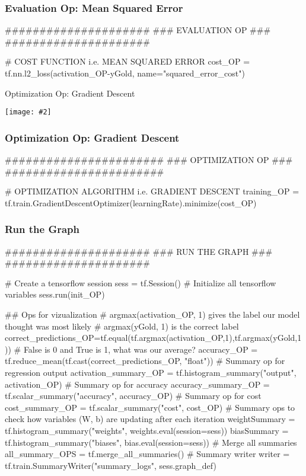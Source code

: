 \documentclass[14pt]{beamer}
\newcommand {\framedgraphic}[2] { %
    \begin{frame}{#1}
        \begin{center}
            \texttt{[image: \#2]}
        \end{center}
    \end{frame}
}
\begin{document}
\begin{frame}[fragile]
  \frametitle{Evaluation Op: Mean Squared Error}
  \begin{python}
#####################
### EVALUATION OP ###
#####################

# COST FUNCTION i.e. MEAN SQUARED ERROR
cost_OP = tf.nn.l2_loss(activation_OP-yGold, name="squared_error_cost")  \end{python}
\end{frame}

\framedgraphic{Optimization Op: Gradient Descent}{6-optimization.png}

\begin{frame}[fragile]
  \frametitle{Optimization Op: Gradient Descent}
  \begin{python}
#######################
### OPTIMIZATION OP ###
#######################

# OPTIMIZATION ALGORITHM i.e. GRADIENT DESCENT
training_OP = tf.train.GradientDescentOptimizer(learningRate).minimize(cost_OP)
  \end{python}
\end{frame}



\begin{frame}[fragile]
  \frametitle{Run the Graph}
  \begin{python}
#####################
### RUN THE GRAPH ###
#####################

# Create a tensorflow session
sess = tf.Session()
# Initialize all tensorflow variables
sess.run(init_OP)

## Ops for vizualization
# argmax(activation_OP, 1) gives the label our model thought was most likely
# argmax(yGold, 1) is the correct label
correct_predictions_OP=tf.equal(tf.argmax(activation_OP,1),tf.argmax(yGold,1))
# False is 0 and True is 1, what was our average?
accuracy_OP = tf.reduce_mean(tf.cast(correct_predictions_OP, "float"))
# Summary op for regression output
activation_summary_OP = tf.histogram_summary("output", activation_OP)
# Summary op for accuracy
accuracy_summary_OP = tf.scalar_summary("accuracy", accuracy_OP)
# Summary op for cost
cost_summary_OP = tf.scalar_summary("cost", cost_OP)
# Summary ops to check how variables (W, b) are updating after each iteration
weightSummary = tf.histogram_summary("weights", weights.eval(session=sess))
biasSummary = tf.histogram_summary("biases", bias.eval(session=sess))
# Merge all summaries
all_summary_OPS = tf.merge_all_summaries()
# Summary writer
writer = tf.train.SummaryWriter("summary_logs", sess.graph_def)
  \end{python}
\end{frame}
\end{document}
